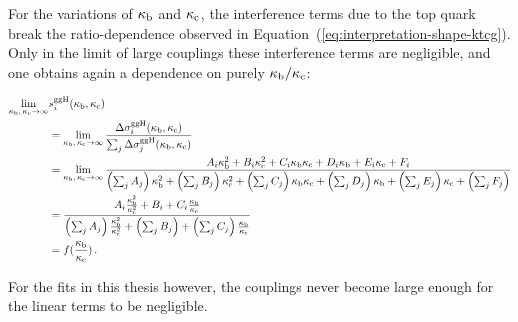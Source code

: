 For the variations of $\kappa_{\mathrm{b}}$ and $\kappa_{\mathrm{c}}$, the interference terms due to the top quark break the ratio-dependence observed in Equation~(\ref{eq:interpretation-shape-ktcg}).
% 
Only in the limit of large couplings these interference terms are negligible, and one obtains again a dependence on purely $\kappa_{\mathrm{b}}/\kappa_{\mathrm{c}}$:
% 
\begin{linenomath*}
\begin{equation}
\label{eq:interpretation-shape-kbkc}
\begin{split}
\lim_{\kappa_{\mathrm{b}},\,\kappa_{\mathrm{c}}\to\infty} & s^{\mathrm{g}\mathrm{g}\mathrm{H}}_i(\kappa_{\mathrm{b}}, \kappa_{\mathrm{c}}) \\
        &=
        \lim_{\kappa_{\mathrm{b}},\,\kappa_{\mathrm{c}}\to\infty}
        \frac
            {\Delta\sigma^{\mathrm{g}\mathrm{g}\mathrm{H}}_i(\kappa_{\mathrm{b}}, \kappa_{\mathrm{c}})}
            {\sum_j \Delta\sigma^{\mathrm{g}\mathrm{g}\mathrm{H}}_j(\kappa_{\mathrm{b}}, \kappa_{\mathrm{c}})}
            \\
        &=
        \lim_{\kappa_{\mathrm{b}},\,\kappa_{\mathrm{c}}\to\infty}
        \frac
            {A_i \kappa_{\mathrm{b}}^2 + B_i \kappa_{\mathrm{c}}^2 + C_i \kappa_{\mathrm{b}} \kappa_{\mathrm{c}}
                + D_i \kappa_{\mathrm{b}} + E_i \kappa_{\mathrm{c}} + F_i
                }
            {
                \left(\sum_j A_j\right) \kappa_{\mathrm{b}}^2
                + \left(\sum_j B_j\right) \kappa_{\mathrm{c}}^2
                + \left(\sum_j C_j\right) \kappa_{\mathrm{b}}\kappa_{\mathrm{c}}
                + \left(\sum_j D_j\right) \kappa_{\mathrm{b}}
                + \left(\sum_j E_j\right) \kappa_{\mathrm{c}}
                + \left(\sum_j F_j\right)
                }
            \\
        &=
        \frac
            {A_i \frac{\kappa_{\mathrm{b}}^2}{\kappa_{\mathrm{c}}^2} + B_i + C_i \frac{\kappa_{\mathrm{b}}}{\kappa_{\mathrm{c}}}}
            {
                \left(\sum_j A_j\right) \frac{\kappa_{\mathrm{b}}^2}{\kappa_{\mathrm{c}}^2}
                + \left(\sum_j B_j\right) 
                + \left(\sum_j C_j\right) \frac{\kappa_{\mathrm{b}}}{\kappa_{\mathrm{c}}}
                }
            \\
        & = f(\frac{\kappa_{\mathrm{b}}}{\kappa_{\mathrm{c}}})
\,.
\end{split}
\end{equation}
\end{linenomath*}
% 
For the fits in this thesis however, the couplings never become large enough for the linear terms to be negligible.








